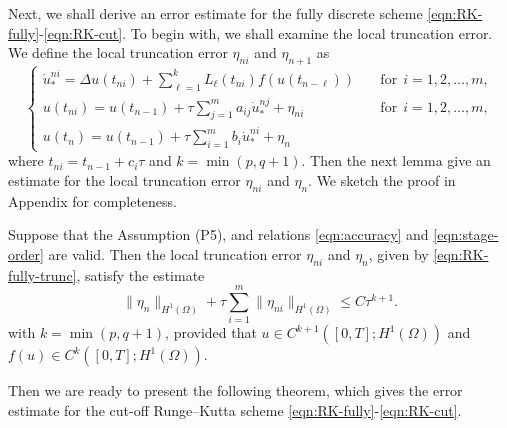 \documentclass[10pt,final,leqno,onefignum,onetabnum]{siamltex}%
\def\II{(\Omega)}
\begin{document}
Next, we shall derive an error estimate for the fully discrete scheme \eqref{eqn:RK-fully}-\eqref{eqn:RK-cut}.
To begin with, we shall examine the local truncation error. We define the local truncation error $\eta_{ni}$ and $\eta_{n+1}$  as
\begin{equation}\label{eqn:RK-fully-trunc}
    \begin{cases}
    \dot u_*^{ni} = \Delta  u(t_{ni}) +
    \sum_{\ell=1}^k L_{\ell}(t_{ni}) f(u(t_{n-\ell}))&\quad \text{for} ~~i=1,2,\dots,m, \\ %
    u(t_{ni})=  u(t_{n-1}) + \tau \sum_{j=1}^m a_{ij} \dot u_*^{nj} + \eta_{ni}&\quad \text{for} ~~i=1,2,\dots,m, \\
    u(t_n) = u(t_{n-1}) + \tau \sum_{i=1}^m b_i \dot u_*^{ni} + \eta_{n}
  \end{cases}
\end{equation}
where $t_{ni}=t_{n-1}+c_i\tau$ and $k=\min(p,q+1)$.
Then the next lemma give an estimate for the local truncation error $\eta_{ni}$ and $\eta_{n}$.
We sketch the proof in Appendix for completeness.

\begin{lemma}\label{lem:RK-local-truncation}
Suppose that the Assumption (P5), and relations \eqref{eqn:accuracy} and \eqref{eqn:stage-order}
are valid. Then the local truncation error $\eta_{ni}$ and $\eta_{n}$, given by \eqref{eqn:RK-fully-trunc},
satisfy the estimate
\begin{equation*}
\| \eta_n \|_{H^1\II}  + \tau \sum_{i=1}^m  \| \eta_{ni} \|_{H^1\II}   \le C \tau^{k+1}.
\end{equation*}
with $k=\min(p,q+1)$, provided that $u\in C^{k+1}([0,T]; H^1\II)$ and $f(u) \in C^k([0,T]; H^1\II)$.
\end{lemma}

Then we are ready to present the following theorem, which gives the error estimate for the
cut-off Runge--Kutta scheme \eqref{eqn:RK-fully}-\eqref{eqn:RK-cut}.
\end{document}
